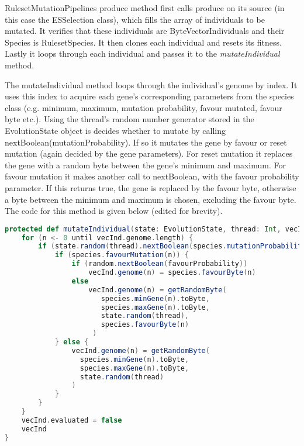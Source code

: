 RulesetMutationPipelines produce method first calls produce on its source (in this case the ESSelection class), which fills the array of individuals to be mutated. It verifies that these individuals are ByteVectorIndividuals and their Species is RulesetSpecies. It then clones each individual and resets its fitness. Lastly it loops through each individual and passes it to the \emph{mutateIndividual} method.

The mutateIndividual method loops through the individual's genome by index. It uses this index to acquire each gene's corresponding parameters from the species class (e.g. minimum, maximum, mutation probability, favour mutated, favour byte etc.). Using the thread's random number generator stored in the EvolutionState object is decides whether to mutate by calling {\ttfamily nextBoolean(mutationProbability)}. If so it mutates the gene by favour or reset mutation (again decided by the gene parameters). For reset mutation it replaces the gene with a random byte between the gene's minimum and maximum. For favour mutation it makes another call to nextBoolean, with the favour probability parameter. If this returns true, the gene is replaced by the favour byte, otherwise a byte between the minimum and maximum is chosen, excluding the favour byte. The code for this method is given below (edited for brevity).

\begin{minipage}{0.9\linewidth}
\centering
\begin{lstlisting}[language=scala]
protected def mutateIndividual(state: EvolutionState, thread: Int, vecInd: ByteVectorIndividual, species: RulesetSpecies): ByteVectorIndividual = {
    for (n <- 0 until vecInd.genome.length) {
        if (state.random(thread).nextBoolean(species.mutationProbability(n))) {
            if (species.favourMutation(n)) {
                if (random.nextBoolean(favourProbability))
                    vecInd.genome(n) = species.favourByte(n)
                else
                    vecInd.genome(n) = getRandomByte(
                       species.minGene(n).toByte,
                       species.maxGene(n).toByte,
                       state.random(thread),
                       species.favourByte(n)
                     )
            } else {
                vecInd.genome(n) = getRandomByte(
                  species.minGene(n).toByte,
                  species.maxGene(n).toByte,
                  state.random(thread)
                )    
            }
        }
    }
    vecInd.evaluated = false
    vecInd
}
\end{lstlisting}
\end{minipage}

